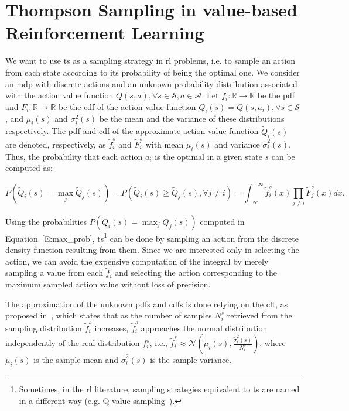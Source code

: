 \section{Thompson Sampling in value-based Reinforcement Learning}\label{S:tsrl}
We want to use \gls{ts} as a sampling strategy in \gls{rl} problems, i.e. to sample an action from each state according to its probability of being the optimal one.
We consider an \gls{mdp} with discrete actions and an unknown probability distribution associated with the action value function $Q(s,a), \forall s \in \mathcal{S}, a \in \mathcal{A}$. Let $f_i:\mathbb{R} \rightarrow \mathbb{R}$ be the \gls{pdf} and $F_i:\mathbb{R} \rightarrow \mathbb{R}$ be the \gls{cdf} of the action-value function $Q_i(s) = Q(s, a_i), \forall s \in \mathcal{S}$, and $\mu_i(s)$ and $\sigma^2_i(s)$ be the mean and the variance of these distributions respectively. The \gls{pdf} and \gls{cdf} of the approximate action-value function $\tilde{Q}_i(s)$ are denoted, respectively, as $\tilde{f}_i^s$ and $\tilde{F}_i^s$ with mean $\tilde{\mu}_i(s)$ and variance $\tilde{\sigma}_i^2(s)$. Thus, the probability that each action $a_i$ is the optimal in a given state $s$ can be computed as:

\begin{equation}\label{E:max_prob}
 P\left(\tilde{Q}_i(s) = \max_j \tilde{Q}_j(s)\right) = P\left(\tilde{Q}_i(s) \geq \tilde{Q}_j(s), \forall j \neq i\right) = \int^{+\infty}_{-\infty} \tilde{f}_i^s(x) \prod_{j \neq i} \tilde{F}_j^s(x) dx.
\end{equation}

Using the probabilities $P\left(\tilde{Q}_i(s) = \max_j \tilde{Q}_j(s)\right)$ computed in Equation~\ref{E:max_prob}, \gls{ts}\footnote{Sometimes, in the \gls{rl} literature, sampling strategies equivalent to \gls{ts} are named in a different way (e.g. Q-value sampling~\cite{dearden1998bayesian}).} can be done by sampling an action from the discrete density function resulting from them. Since we are interested only in selecting the action, we can avoid the expensive computation of the integral by merely sampling a value from each $\tilde{f}_i$ and selecting the action corresponding to the maximum sampled action value without loss of precision.

The approximation of the unknown \glspl{pdf} and \glspl{cdf} is done relying on the \gls{clt}, as proposed in~\cite{deramo2016estimating}, which states that as the number of samples $N_i^s$ retrieved from the sampling distribution $\tilde{f}_i^s$ increases, $\tilde{f}_i^s$ approaches the normal distribution independently of the real distribution $f_i^s$, i.e., $\tilde{f}_i^s \approx \mathcal{N}\left(\tilde{\mu}_i(s), \frac{\tilde{\sigma}^2_i(s)}{N_i^s}\right)$, where $\tilde{\mu}_i(s)$ is the sample mean and $\tilde{\sigma}^2_i(s)$ is the sample variance. 

